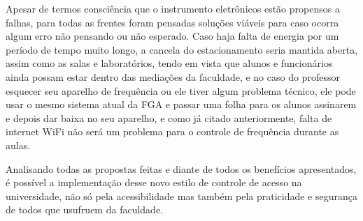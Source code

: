 Apesar de termos consciência que o instrumento eletrônicos estão propensos a
falhas, para todas as frentes foram pensadas soluções viáveis para caso ocorra
algum erro não pensando ou não esperado. Caso haja falta de energia por um
período de tempo muito longo, a cancela do estacionamento seria mantida aberta,
assim como as salas e laboratórios, tendo em vista que alunos e funcionários
ainda possam estar dentro das mediações da faculdade, e no caso do professor
esquecer seu aparelho de frequência ou ele tiver algum problema técnico, ele
pode usar o mesmo sistema atual da FGA e passar uma folha para os alunos
assinarem e depois dar baixa no seu aparelho, e como já citado anteriormente,
falta de internet WiFi não será um problema para o controle de frequência
durante as aulas.

Analisando todas as propostas feitas e diante de todos os benefícios
apresentados, é possível a implementação desse novo estilo de controle de acesso
na universidade, não só pela acessibilidade mas também pela praticidade e
segurança de todos que usufruem da faculdade.

